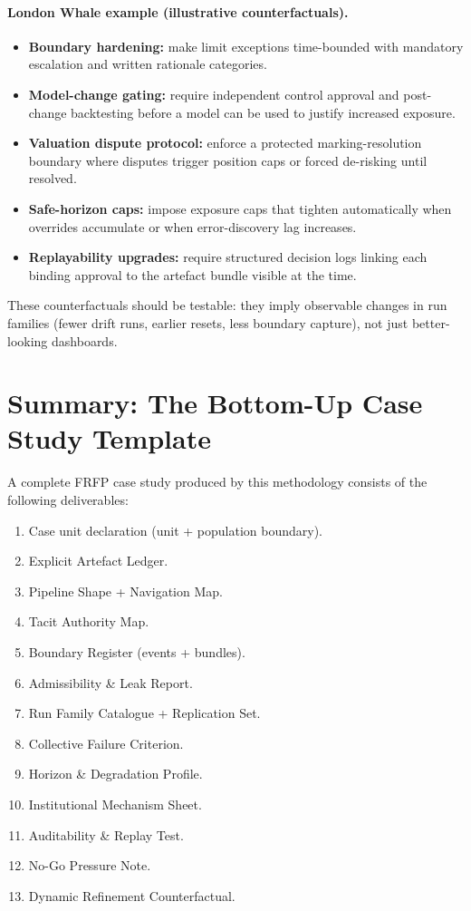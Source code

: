 \paragraph{London Whale example (illustrative counterfactuals).}
\begin{itemize}
  \item \textbf{Boundary hardening:} make limit exceptions time-bounded with mandatory escalation and written rationale categories.
  \item \textbf{Model-change gating:} require independent control approval and post-change backtesting before a model can be used to justify increased exposure.
  \item \textbf{Valuation dispute protocol:} enforce a protected marking-resolution boundary where disputes trigger position caps or forced de-risking until resolved.
  \item \textbf{Safe-horizon caps:} impose exposure caps that tighten automatically when overrides accumulate or when error-discovery lag increases.
  \item \textbf{Replayability upgrades:} require structured decision logs linking each binding approval to the artefact bundle visible at the time.
\end{itemize}

These counterfactuals should be testable: they imply observable changes in run families (fewer drift runs, earlier resets, less boundary capture),
not just better-looking dashboards.

\section{Summary: The Bottom-Up Case Study Template}

A complete FRFP case study produced by this methodology consists of the following deliverables:

\begin{enumerate}
  \item Case unit declaration (unit + population boundary).
  \item Explicit Artefact Ledger.
  \item Pipeline Shape + Navigation Map.
  \item Tacit Authority Map.
  \item Boundary Register (events + bundles).
  \item Admissibility \& Leak Report.
  \item Run Family Catalogue + Replication Set.
  \item Collective Failure Criterion.
  \item Horizon \& Degradation Profile.
  \item Institutional Mechanism Sheet.
  \item Auditability \& Replay Test.
  \item No-Go Pressure Note.
  \item Dynamic Refinement Counterfactual.
\end{enumerate}

